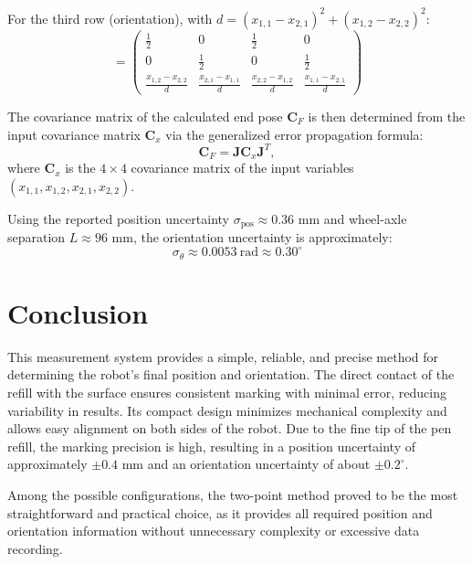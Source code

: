 For the third row (orientation), with $d = (x_{1,1} - x_{2,1})^2 + (x_{1,2} - x_{2,2})^2$:
\[
= \begin{pmatrix}
\frac{1}{2} & 0 & \frac{1}{2} & 0 \\
0 & \frac{1}{2} & 0 & \frac{1}{2} \\
\frac{x_{1,2}-x_{2,2}}{d} & \frac{x_{2,1}-x_{1,1}}{d} & \frac{x_{2,2}-x_{1,2}}{d} & \frac{x_{1,1}-x_{2,1}}{d}
\end{pmatrix}
\]

The covariance matrix of the calculated end pose $\mathbf{C}_F$ is then determined from the input covariance matrix $\mathbf{C}_x$ via the generalized error propagation formula:
\begin{equation}
\mathbf{C}_F = \mathbf{J}\mathbf{C}_x\mathbf{J}^T,
\end{equation}
where $\mathbf{C}_x$ is the $4 \times 4$ covariance matrix of the input variables $(x_{1,1}, x_{1,2}, x_{2,1}, x_{2,2})$.

Using the reported position uncertainty $\sigma_{\text{pos}} \approx 0.36$ mm and wheel-axle separation $L \approx 96$ mm, the orientation uncertainty is approximately:
\[
\boxed{\sigma_\theta \approx 0.0053\ \text{rad} \approx 0.30^\circ}
\]

\section{Conclusion}

This measurement system provides a simple, reliable, and precise method for determining the robot's final position and orientation. The direct contact of the refill with the surface ensures consistent marking with minimal error, reducing variability in results. Its compact design minimizes mechanical complexity and allows easy alignment on both sides of the robot. Due to the fine tip of the pen refill, the marking precision is high, resulting in a position uncertainty of approximately $\pm 0.4$ mm and an orientation uncertainty of about $\pm 0.2^{\circ}$.

Among the possible configurations, the two-point method proved to be the most straightforward and practical choice, as it provides all required position and orientation information without unnecessary complexity or excessive data recording.
